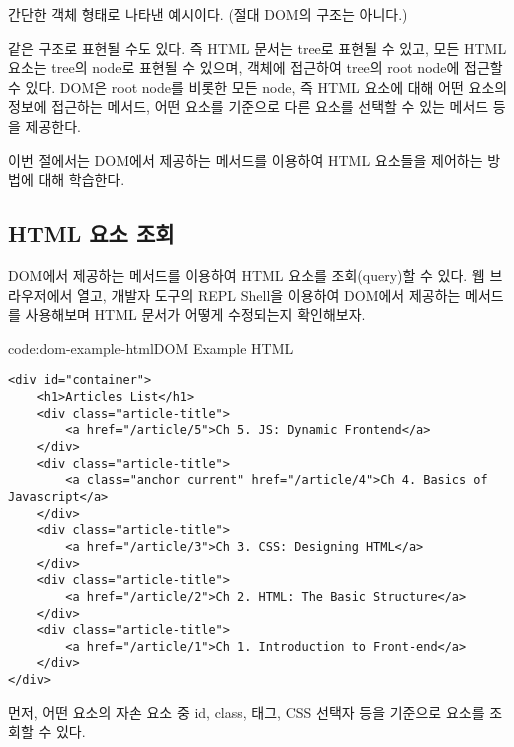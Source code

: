 \는 \을 간단한 객체 형태로 나타낸 예시이다. (절대 DOM의 구조는 아니다.)

    {}

\은 \와 같은 구조로 표현될 수도 있다. 즉 HTML 문서는 tree로 표현될 수 있고, 모든 HTML 요소는 tree의 node로 표현될 수 있으며,  객체에 접근하여 tree의 root node에 접근할 수 있다. DOM은 root node를 비롯한 모든 node, 즉 HTML 요소에 대해 어떤 요소의 정보에 접근하는 메서드, 어떤 요소를 기준으로 다른 요소를 선택할 수 있는 메서드 등을 제공한다.

이번 절에서는 DOM에서 제공하는 메서드를 이용하여 HTML 요소들을 제어하는 방법에 대해 학습한다.

\subsection*{HTML 요소 조회}

DOM에서 제공하는 메서드를 이용하여 HTML 요소를 조회(query)할 수 있다. \을 웹 브라우저에서 열고, 개발자 도구의 REPL Shell을 이용하여 DOM에서 제공하는 메서드를 사용해보며 HTML 문서가 어떻게 수정되는지 확인해보자.

\begin{codeenv}{code:dom-example-html}{DOM Example HTML}\begin{verbatim}
<div id="container">
    <h1>Articles List</h1>
    <div class="article-title">
        <a href="/article/5">Ch 5. JS: Dynamic Frontend</a>
    </div>
    <div class="article-title">
        <a class="anchor current" href="/article/4">Ch 4. Basics of Javascript</a>
    </div>
    <div class="article-title">
        <a href="/article/3">Ch 3. CSS: Designing HTML</a>
    </div>
    <div class="article-title">
        <a href="/article/2">Ch 2. HTML: The Basic Structure</a>
    </div>
    <div class="article-title">
        <a href="/article/1">Ch 1. Introduction to Front-end</a>
    </div>
</div>
\end{verbatim}
\end{codeenv}

먼저, 어떤 요소의 자손 요소 중 id, class, 태그, CSS 선택자 등을 기준으로 요소를 조회할 수 있다.

